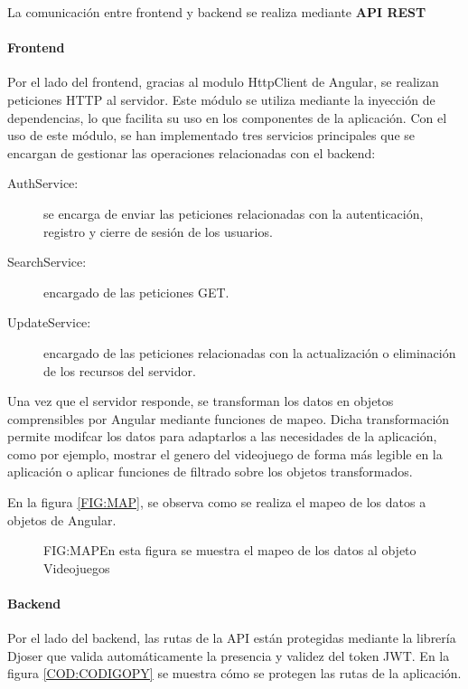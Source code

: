 La comunicación entre frontend y backend se realiza mediante \textbf{API REST}

\paragraph{Frontend}
Por el lado del frontend, gracias al modulo HttpClient de Angular, se realizan peticiones HTTP al servidor.
Este módulo se utiliza mediante la inyección de dependencias, lo que facilita su uso en los componentes de la aplicación.
Con el uso de este módulo, se han implementado tres servicios principales que se encargan de gestionar las operaciones relacionadas con el backend:
\begin{description}
    \item [AuthService:] se encarga de enviar las peticiones relacionadas con la autenticación, registro y cierre de sesión de los usuarios.
    \item [SearchService:] encargado de las peticiones GET.
    \item [UpdateService:] encargado de las peticiones relacionadas con la actualización o eliminación de los recursos del servidor.
\end{description} 

Una vez que el servidor responde, se transforman los datos en objetos comprensibles por Angular mediante funciones de mapeo.
Dicha transformación permite modifcar los datos para adaptarlos a las necesidades de la aplicación, como por ejemplo,
mostrar el genero del videojuego de forma más legible en la aplicación o aplicar funciones de filtrado sobre los objetos 
transformados.

En la figura \ref{FIG:MAP}, se observa como se realiza el mapeo de los datos a objetos de Angular. 

\begin{figure}[Mapeo de respuesta]{FIG:MAP}{En esta figura se muestra el mapeo de los datos al objeto Videojuegos}
\end{figure}

\paragraph{Backend}
Por el lado del backend, las rutas de la API están protegidas mediante la librería Djoser que valida automáticamente la presencia y validez del token JWT.
En la figura \ref{COD:CODIGOPY} se muestra cómo se protegen las rutas de la aplicación.

